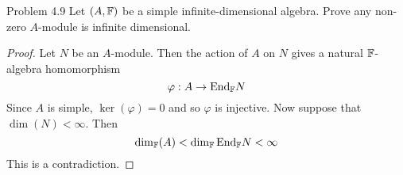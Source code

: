\documentclass[a4paper]{article}
\begin{document}
\begin{ex}{Problem 4.9}{} Let $(A,\mathbb{F})$ be a simple infinite-dimensional algebra. Prove any non-zero $A$-module is infinite dimensional. \tcbline
\begin{proof}
Let $N$ be an $A$-module. Then the action of $A$ on $N$ gives a natural $\mathbb{F}$-algebra homomorphism $$\varphi:A\to\text{End}_{\mathbb{F}} N$$ Since $A$ is simple, $\ker(\varphi)=0$ and so $\varphi$ is injective. Now suppose that $\dim(N)<\infty$. Then $$\dim_{\mathbb{F}}(A)<\dim_{\mathbb{F}}\text{End}_{\mathbb{F}} N<\infty$$ This is a contradiction. 
\end{proof}
\end{ex}
\end{document}
